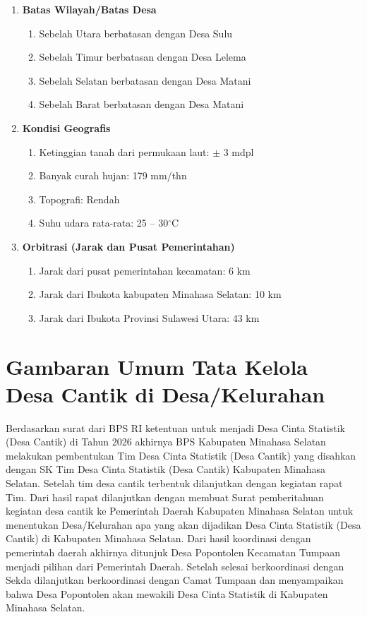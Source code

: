 \begin{enumerate}[label=\textbf{\textcolor{bpsnavy}{\arabic*.}}]
  \item \textbf{Batas Wilayah/Batas Desa}
  \begin{enumerate}[label=\textcolor{bpsnavy}{\alph*.}]
    \item Sebelah Utara berbatasan dengan Desa Sulu
    \item Sebelah Timur berbatasan dengan Desa Lelema
    \item Sebelah Selatan berbatasan dengan Desa Matani
    \item Sebelah Barat berbatasan dengan Desa Matani
  \end{enumerate}

  \item \textbf{Kondisi Geografis}
  \begin{enumerate}[label=\textcolor{bpsnavy}{\alph*.}]
    \item Ketinggian tanah dari permukaan laut: $\pm$ 3 mdpl
    \item Banyak curah hujan: 179 mm/thn
    \item Topografi: Rendah
    \item Suhu udara rata-rata: 25 -- 30$^\circ$C
  \end{enumerate}

  \item \textbf{Orbitrasi (Jarak dan Pusat Pemerintahan)}
  \begin{enumerate}[label=\textcolor{bpsnavy}{\alph*.}]
    \item Jarak dari pusat pemerintahan kecamatan: 6 km
    \item Jarak dari Ibukota kabupaten Minahasa Selatan: 10 km
    \item Jarak dari Ibukota Provinsi Sulawesi Utara: 43 km
  \end{enumerate}
\end{enumerate}

\section{Gambaran Umum Tata Kelola Desa Cantik di Desa/Kelurahan}

Berdasarkan surat dari BPS RI ketentuan untuk menjadi Desa Cinta Statistik (Desa Cantik) di Tahun 2026 akhirnya BPS Kabupaten Minahasa Selatan melakukan pembentukan Tim Desa Cinta Statistik (Desa Cantik) yang disahkan dengan SK Tim Desa Cinta Statistik (Desa Cantik) Kabupaten Minahasa Selatan. Setelah tim desa cantik terbentuk dilanjutkan dengan kegiatan rapat Tim. Dari hasil rapat dilanjutkan dengan membuat Surat pemberitahuan kegiatan desa cantik ke Pemerintah Daerah Kabupaten Minahasa Selatan untuk menentukan Desa/Kelurahan apa yang akan dijadikan Desa Cinta Statistik (Desa Cantik) di Kabupaten Minahasa Selatan. Dari hasil koordinasi dengan pemerintah daerah akhirnya ditunjuk Desa Popontolen Kecamatan Tumpaan menjadi pilihan dari Pemerintah Daerah. Setelah selesai berkoordinasi dengan Sekda dilanjutkan berkoordinasi dengan Camat Tumpaan dan menyampaikan bahwa Desa Popontolen akan mewakili Desa Cinta Statistik di Kabupaten Minahasa Selatan.

